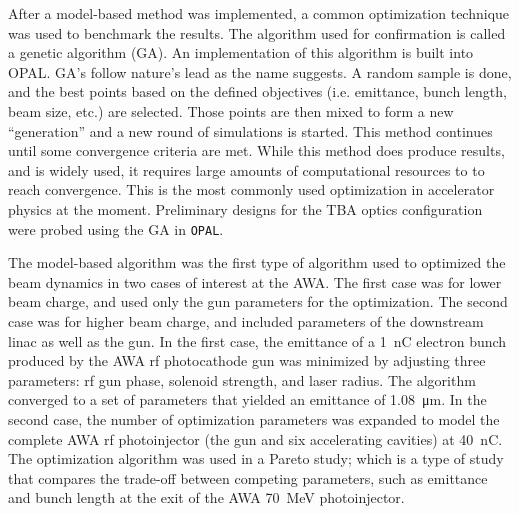 After a model-based method was implemented, 
a common optimization technique was used to benchmark the results. 
The algorithm used for confirmation 
is called a genetic algorithm (GA). An implementation of this algorithm is
built into OPAL. GA's follow nature's lead as the name suggests.
A random sample is done, and the best points based on the defined objectives
(i.e. emittance, bunch length, beam size, etc.)
are selected. Those points are then mixed to form a new ``generation''
and a new round of simulations is started. This method continues
until some convergence criteria are met. While this method does 
produce results, and is widely used, it requires large amounts 
of computational resources to to reach convergence.
This is the most commonly used optimization in accelerator physics
at the moment. Preliminary designs 
for the TBA optics configuration were probed using the GA in \verb|OPAL|. 



The model-based algorithm was the first type of algorithm used to optimized the beam dynamics 
in two cases of interest at the AWA.
The first case was for lower beam charge, and used only the gun parameters for the optimization.  
The second case was for higher beam charge, and included parameters of the downstream linac as well as the gun.
In the first case,  the emittance of a \SI{1}{nC} electron 
bunch produced by the AWA rf photocathode gun 
was minimized by adjusting three parameters: rf gun phase, 
solenoid strength, and laser radius. The algorithm 
converged to a set of parameters that yielded an
emittance of \SI{1.08}{\um}. In the second case, 
the number of optimization parameters was expanded to model the complete AWA rf 
photoinjector (the gun and six accelerating cavities) at \SI{40}{nC}. 
The optimization algorithm was used in a Pareto study; which is a type of study that compares the 
trade-off between competing parameters, such as emittance and bunch 
length at the exit of the AWA \SI{70}{MeV} photoinjector. 

